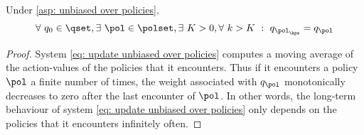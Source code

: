 \begin{lemma}
\label{thm: all qpol in Pinf are equivalent}
Under \autoref{asp: unbiased over policies},
\begin{align}
    \forall \ q_0 \in \qset, 
    \exists \ \pol \in \polset, 
    \exists \ K>0, 
    \forall \ k > K \ : \ 
    q_{\pol_\kpz} = q_\pol
\end{align}

\end{lemma}
\begin{proof}

System \eqref{eq: update unbiased over policies} computes a moving average of the action-values of the policies that it encounters.
Thus if it encounters a policy $\pol$ a finite number of times, the weight associated with $q_\pol$ monotonically decreases to zero after the last encounter of $\pol$. %
In other words, the long-term behaviour of system \eqref{eq: update unbiased over policies} only depends on the policies that it encounters infinitely often.


\end{proof}
